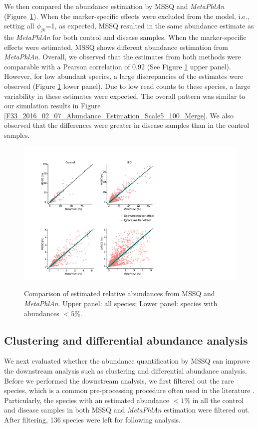 We then compared the abundance estimation by MSSQ and {\it MetaPhlAn} (Figure~\ref{PLEASE_COMBO_Abundance_Estimation}). When  the marker-specific  effects were excluded from the model, i.e., setting all $\phi_{jk}$=1, as expected, MSSQ resulted in  the same abundance estimate as the {\it MetaPhlAn} for both control and disease samples. When the marker-specific  effects were estimated, MSSQ shows different abundance estimation from  {\it MetaPhlAn}. Overall, we observed that the estimates from both methods were comparable with a Pearson correlation of 0.92 (See Figure \ref{PLEASE_COMBO_Abundance_Estimation} upper panel). However, for low abundant species, a large discrepancies of the estimates were observed (Figure \ref{PLEASE_COMBO_Abundance_Estimation} lower panel).  Due to low read counts to these species, a large variability in these estimates were expected. The overall pattern was similar to our simulation results in Figure \ref{F33_2016_02_07_Abundance_Estimation_Scale5_100_Merge}. We also observed that the differences were greater in disease samples than in the control samples.

\begin{figure}[ht]
\centering
{\includegraphics[scale=0.8,trim=20 10 150 0,clip]
{Figure/F34_2016_02_01_PLEASE_COMBO_Abundance_Estimation_Merge.pdf}
}
\caption[Comparison of estimated relative abundances from MSSQ and {\it MetaPhlAn}]{Comparison of estimated relative abundances from MSSQ and {\it MetaPhlAn}. Upper panel: all species; Lower panel: species with abundances $<5\%$. }
\label{PLEASE_COMBO_Abundance_Estimation}
\end{figure}


\subsection{Clustering and differential abundance analysis}
We next evaluated whether the abundance quantification by MSSQ can improve the downstream analysis such as clustering and differential abundance analysis. Before we performed the downstream analysis, we first filtered out the rare species, which is a common pre-processing procedure  often used in the literature \citep{Kostic:2015bh,Romero:2014il,Stein:2013dl}. Particularly, the species with an estimated abundance $< 1\%$ in all the control and disease samples in both MSSQ and {\it MetaPhlAn} estimation were filtered out. After filtering, 136 species were left for following analysis. 

